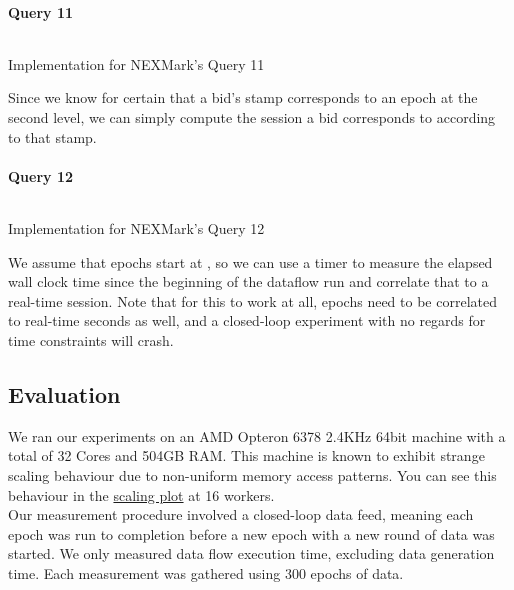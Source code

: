 \paragraph{Query 11}
\begin{listing}[H]
  \inputminted[firstline=784,lastline=787]{rust}{benchmarks/src/nexmark.rs}
  \caption{Implementation for NEXMark's Query 11}
  \label{lst:nexmark-query11}
\end{listing}

Since we know for certain that a bid's  stamp corresponds to an epoch at the second level, we can simply compute the session a bid corresponds to according to that stamp.

\paragraph{Query 12}
\begin{listing}[H]
  \inputminted[firstline=810,lastline=817]{rust}{benchmarks/src/nexmark.rs}
  \caption{Implementation for NEXMark's Query 12}
  \label{lst:nexmark-query12}
\end{listing}

We assume that epochs start at , so we can use a timer to measure the elapsed wall clock time since the beginning of the dataflow run and correlate that to a real-time session. Note that for this to work at all, epochs need to be correlated to real-time seconds as well, and a closed-loop experiment with no regards for time constraints will crash.

\subsection{Evaluation}
We ran our experiments on an AMD Opteron 6378 2.4KHz 64bit machine with a total of 32 Cores and 504GB RAM. This machine is known to exhibit strange scaling behaviour due to non-uniform memory access patterns. You can see this behaviour in the \hyperref[figure:ysb-scaling]{scaling plot} at 16 workers. \\

Our measurement procedure involved a closed-loop data feed, meaning each epoch was run to completion before a new epoch with a new round of data was started. We only measured data flow execution time, excluding data generation time. Each measurement was gathered using 300 epochs of data. \\

